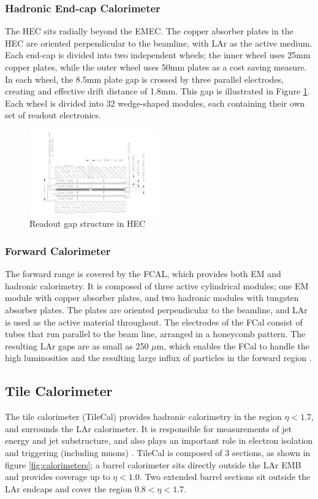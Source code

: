 \subsubsection{Hadronic End-cap Calorimeter}
The HEC sits radially beyond the EMEC. The copper absorber plates in the HEC are oriented perpendicular to the beamline, with LAr as the active medium. Each end-cap is divided into two independent wheels; the inner wheel uses 25mm copper plates, while the outer wheel uses 50mm plates as a cost saving measure. In each wheel, the 8.5mm plate gap is crossed by three parallel electrodes, creating and effective drift distance of 1.8mm. This gap is illustrated in Figure \ref{fig:hec}. Each wheel is divided into 32 wedge-shaped modules, each containing their own set of readout electronics.

\begin{figure}
        \centering
	\includegraphics[width=0.5\textwidth]{figures/ch3/hec.png}
	\caption{Readout gap structure in HEC \cite{lar_tdr}}
	\label{fig:hec}
\end{figure}

\subsubsection{Forward Calorimeter}
The forward range is covered by the FCAL, which provides both EM and hadronic calorimetry. It is composed of three active cylindrical modules; one EM module with copper absorber plates, and two hadronic modules with tungsten absorber plates. The plates are oriented perpendicular to the beamline, and LAr is used as the active material throughout. The electrodes of the FCal consist of tubes that run parallel to the beam line, arranged in a honeycomb pattern. The resulting LAr gaps are as small as 250 $\mu$m, which enables the FCal to handle the high luminosities and the resulting large influx of particles in the forward region \cite{lar_tdr}. 

\subsection{Tile Calorimeter}
The tile calorimeter (TileCal) provides hadronic calorimetry in the region $\eta < 1.7$, and surrounds the LAr calorimeter. It is responsible for measurements of jet energy and jet substructure, and also plays an important role in electron isolation and triggering (including muons) \cite{tile_tdr}. TileCal is composed of 3 sections, as shown in figure \ref{fig:calorimeters}; a barrel calorimeter sits directly outside the LAr EMB and provides coverage up to $\eta < 1.0$. Two extended barrel sections sit outside the LAr endcaps and cover the region $0.8 < \eta < 1.7$. \\

